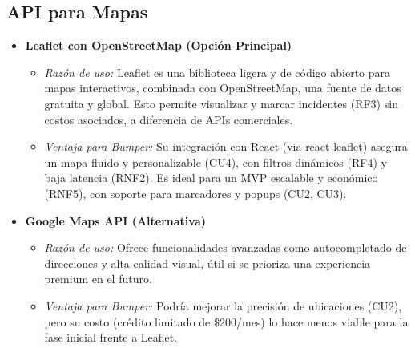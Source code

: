 \subsection*{API para Mapas}
\begin{itemize}
    \item \textbf{Leaflet con OpenStreetMap (Opción Principal)}
    \begin{itemize}
        \item \textit{Razón de uso:} Leaflet es una biblioteca ligera y de código abierto para mapas interactivos, combinada con OpenStreetMap, una fuente de datos gratuita y global. Esto permite visualizar y marcar incidentes (RF3) sin costos asociados, a diferencia de APIs comerciales.
        \item \textit{Ventaja para Bumper:} Su integración con React (via react-leaflet) asegura un mapa fluido y personalizable (CU4), con filtros dinámicos (RF4) y baja latencia (RNF2). Es ideal para un MVP escalable y económico (RNF5), con soporte para marcadores y popups (CU2, CU3).
    \end{itemize}
    \item \textbf{Google Maps API (Alternativa)}
    \begin{itemize}
        \item \textit{Razón de uso:} Ofrece funcionalidades avanzadas como autocompletado de direcciones y alta calidad visual, útil si se prioriza una experiencia premium en el futuro.
        \item \textit{Ventaja para Bumper:} Podría mejorar la precisión de ubicaciones (CU2), pero su costo (crédito limitado de \$200/mes) lo hace menos viable para la fase inicial frente a Leaflet.
    \end{itemize}
\end{itemize}